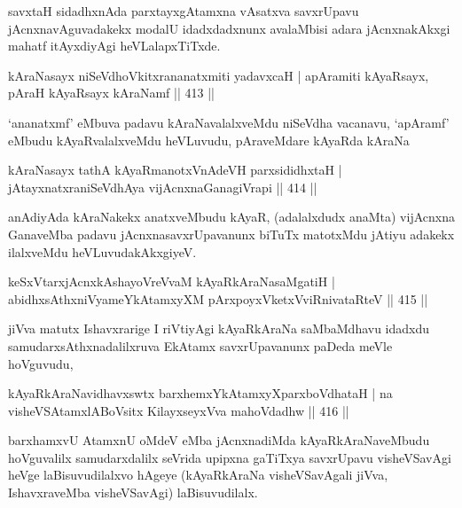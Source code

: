 \begin{artha}
savxtaH sidadhxnAda parxtayxgAtamxna vAsatxva savxrUpavu jAcnxnavAguvadakekx modalU idadxdadxnunx avalaMbisi adara jAcnxnakAkxgi mahatf itAyxdiyAgi heVLalapxTiTxde. 
\end{artha}


\begin{shl}
kAraNasayx niSeVdhoVkitxrananatxmiti yadavxcaH |
apAramiti kAyaRsayx, pAraH kAyaRsayx kAraNamf \hfill  || 413 ||
\end{shl}

\begin{artha}
`ananatxmf' eMbuva padavu kAraNavalalxveMdu niSeVdha vacanavu, `apAramf' eMbudu kAyaRvalalxveMdu heVLuvudu, pAraveMdare kAyaRda kAraNa
\end{artha}


\begin{shl}
kAraNasayx tathA kAyaRmanotxV\s nAdeVH parxsididhxtaH |
jAtayxnatxraniSeVdhAya vijAcnxnaGanagiVrapi \hfill  || 414 ||
\end{shl}

\begin{artha}
anAdiyAda kAraNakekx anatxveMbudu kAyaR, (adalalxdudx anaMta) vijAcnxna GanaveMba padavu jAcnxnasavxrUpavanunx biTuTx matotxMdu jAtiyu adakekx ilalxveMdu heVLuvudakAkxgiyeV.
\end{artha}

\begin{shl}
keSxVtarxjAcnxkAshayoVreVvaM kAyaRkAraNasaMgatiH |
abidhxsAthxniVyameYkAtamxyXM pArxpoyxVketxVviRnivataRteV \hfill  || 415 ||
\end{shl}

\begin{artha}
jiVva matutx Ishavxrarige I riVtiyAgi kAyaRkAraNa saMbaMdhavu idadxdu samudarxsAthxnadalilxruva EkAtamx savxrUpavanunx paDeda meVle hoVguvudu,
\end{artha}

\begin{shl}
kAyaRkAraNavidhavxswtx barxhemxYkAtamxyXparxboVdhataH |
na visheVSAtamxlABoV\s sitx KilayxseyxVva mahoVdadhw \hfill  || 416 ||
\end{shl}

\begin{artha}
barxhamxvU AtamxnU oMdeV eMba jAcnxnadiMda kAyaRkAraNaveMbudu hoVguvalilx samudarxdalilx seVrida upipxna gaTiTxya savxrUpavu visheVSavAgi heVge laBisuvudilalxvo hAgeye (kAyaRkAraNa visheVSavAgali jiVva, IshavxraveMba visheVSavAgi) laBisuvudilalx.
\end{artha}


